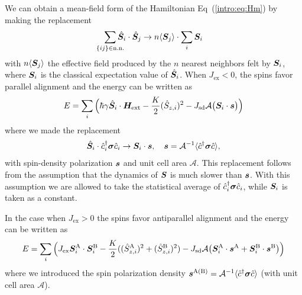 We can obtain a mean-field form of the Hamiltonian Eq~(\ref{intro:eq:Hm}) by making the replacement
\begin{equation}
    \sum_{\mathclap{\{ij\}\in\text{n.n.}}} \hat{\bb{S}}_i\cdot\hat{\bb{S}}_j\rightarrow n\langle\bb{S}_j\rangle\cdot\sum_i \bb{S}_i
    \label{eq:meanfield}
\end{equation}
with $n \langle \boldsymbol{S}_j\rangle$ the effective field produced by the $n$ nearest neighbors felt by $\boldsymbol{S}_i$, where $\boldsymbol{S}_i$ is the classical expectation value of $\hat{\boldsymbol{S}}_i$.  When $J_\text{ex}<0$, the spins favor parallel alignment and the energy can be written as
\begin{equation}
    E = \sum_{i} \Big(\hbar\gamma \hat{\boldsymbol{S}}_i\cdot \boldsymbol{H}_{\text{ext}}
    - \frac{K}{2}(\hat{S}_{z,i})^2
    -J_{\text{sd}}\mathcal{A}\big(\boldsymbol{S}_i\cdot\boldsymbol{s}\big)
        \Big)
        \label{intro:eq:E1}
\end{equation}
where we made the replacement
\begin{align}
    \hat{\boldsymbol{S}}_i\cdot\hat{c}_i^\dagger\boldsymbol{\sigma}\hat{c}_i \rightarrow \boldsymbol{S}_i\cdot\boldsymbol{s}, \quad \boldsymbol{s} = \mathcal{A}^{-1}\langle \hat{c}^\dagger \boldsymbol{\sigma}\hat{c}\rangle,
\end{align}
with spin-density polarization $\boldsymbol{s}$ and unit cell area $\mathcal{A}$. This replacement follows from the assumption that the dynamics of $\boldsymbol{S}$ is much slower than $\boldsymbol{s}$. With this assumption we are allowed to take the statistical average of $\hat{c}_i^\dagger\boldsymbol{\sigma}\hat{c}_i$, while $\boldsymbol{S}_i$ is taken as a constant.

In the case when $J_\text{ex}>0$ the spins favor antiparallel alignment and the energy can be written as
\begin{equation}
    E = \sum_{i} \Big(J_{\text{ex}}\boldsymbol{S}^\text{A}_i\cdot\boldsymbol{S}^\text{B}_i 
    - \frac{K}{2}((\hat{S}_{z,i}^\text{A})^2+(\hat{S}_{z,i}^\text{B})^2)
    -J_{\text{sd}}\mathcal{A}\big(\boldsymbol{S}^\text{A}_i\cdot\boldsymbol{s}^\text{A}+\boldsymbol{S}^\text{B}_i\cdot\boldsymbol{s}^\text{B}\big)
        \Big)
        \label{intro:eq:E2}
\end{equation}
where we introduced the spin polarization density $\boldsymbol{s}^\text{A(B)} = \mathcal{A}^{-1}\langle \hat{c}^\dagger \boldsymbol{\sigma}\hat{c}\rangle$ (with unit cell area $\mathcal{A}$). 

